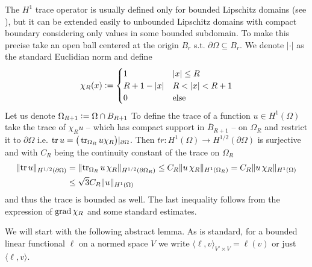 \documentclass[../master_thesis.tex]{subfiles}
\begin{document}
\begin{remark}
    The $H^1$ trace operator is usually defined only for bounded Lipschitz domains 
    (see \cite[Thm.\,3.9]{monk}), but it can be extended easily to unbounded Lipschitz domains with 
    compact boundary considering only values in some bounded subdomain. 
    To make this precise take an open ball centered at the origin $B_r$
    s.t. $\partial \Omega \subseteq B_r$. We denote $|\cdot |$ as the standard 
    Euclidian norm and
    define 
    \begin{align*}
        \chi_R(x) \vcentcolon= 
        \begin{cases}
            1 & |x| \leq R
            \\ R + 1 - |x| & R < |x| < R+1
            \\ 0 & \text{else}
        \end{cases}        
    \end{align*}
    Let us denote 
    $\Omega_{R+1} \vcentcolon=  \Omega \cap B_{R+1}$
    To define the trace of a function $u \in H^1(\Omega)$ take the trace of
    $\chi_R u$ -- which has compact support in $\overline{B}_{R+1}$ -- 
    on $\Omega_R$ and restrict it to $\partial \Omega$ 
    i.e. $\operatorname{tr} u = \big( \operatorname{tr}_{\Omega_R} u\chi_R \big)|_{\partial \Omega}$.
    Then $tr: H^1(\Omega) \rightarrow H^{1/2}(\partial \Omega)$ is 
    surjective and with $C_R$ being the continuity constant of the trace on $\Omega_R$
    \begin{align*}
        \lVert \operatorname{tr} u \rVert _{H^{1/2}(\partial \Omega)}
        &= \lVert \operatorname{tr}_{\Omega_R} u\,\chi_R  \rVert _{H^{1/2}(\partial \Omega_R)}
        \leq C_R \lVert u\,\chi_R  \rVert _{H^1(\Omega_R)}
        = C_R \lVert u\,\chi_R  \rVert _{H^1(\Omega)}
        \\ &\leq \sqrt{3} C_R \lVert u  \rVert _{H^1(\Omega)}
    \end{align*}
    and thus the trace is bounded as well. The last inequality follows from 
    the expression of $\operatorname{grad} \chi_R$ and some standard estimates.
\end{remark}

We will start with the following abstract lemma. As is standard, for a bounded linear 
functional $\ell$ on a normed space $V$ we write $\langle \ell, v \rangle_{V'\times V} = \ell(v)$ 
or just $\langle \ell, v \rangle$.
\end{document}
